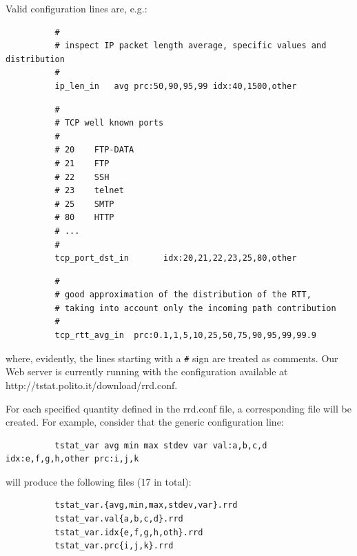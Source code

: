 \documentclass[11pt]{article}
\begin{document}
Valid configuration lines are, e.g.:

\begin{small}\begin{verbatim}
          #
          # inspect IP packet length average, specific values and distribution
          #
          ip_len_in   avg prc:50,90,95,99 idx:40,1500,other
\end{verbatim}\end{small} \noindent
\begin{small}\begin{verbatim}
          #
          # TCP well known ports       
          #                       
          # 20    FTP-DATA             
          # 21    FTP                  
          # 22    SSH                  
          # 23    telnet               
          # 25    SMTP                 
          # 80    HTTP                 
          # ...                        
          #
          tcp_port_dst_in       idx:20,21,22,23,25,80,other
\end{verbatim}\end{small} \noindent
\begin{small}\begin{verbatim}
          #
          # good approximation of the distribution of the RTT,
          # taking into account only the incoming path contribution
          #
          tcp_rtt_avg_in  prc:0.1,1,5,10,25,50,75,90,95,99,99.9
\end{verbatim}\end{small} \noindent
where, evidently, the lines starting with a \texttt{\#} sign are treated as comments.
Our Web server is currently running with the configuration
available at \textsf{http://tstat.polito.it/download/rrd.conf}.



For each specified quantity defined in the rrd.conf file, a corresponding file
will be created.
For example, consider that the generic configuration line:

\begin{small}\begin{verbatim}
          tstat_var avg min max stdev var val:a,b,c,d idx:e,f,g,h,other prc:i,j,k
\end{verbatim}\end{small} \noindent
will produce the following files (17 in total):

\begin{small}\begin{verbatim}
          tstat_var.{avg,min,max,stdev,var}.rrd
          tstat_var.val{a,b,c,d}.rrd
          tstat_var.idx{e,f,g,h,oth}.rrd
          tstat_var.prc{i,j,k}.rrd
\end{verbatim}\end{small} \noindent
\end{document}
